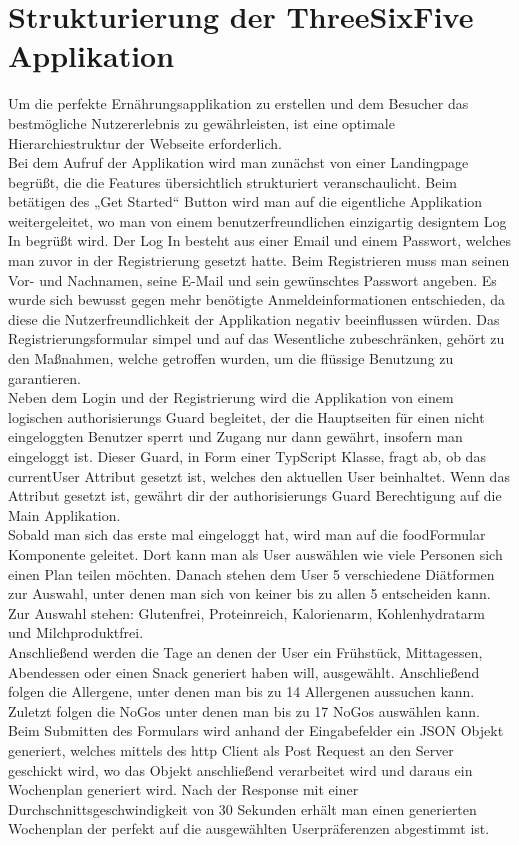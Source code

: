 \section{Strukturierung der ThreeSixFive Applikation}
Um die perfekte Ernährungsapplikation zu erstellen und dem Besucher das bestmögliche Nutzererlebnis zu gewährleisten, ist eine optimale Hierarchiestruktur der Webseite erforderlich.\\
Bei dem Aufruf der Applikation wird man zunächst von einer Landingpage begrüßt, die die Features übersichtlich strukturiert veranschaulicht. Beim betätigen des „Get Started“ Button wird man auf die eigentliche Applikation weitergeleitet, wo man von einem benutzerfreundlichen einzigartig designtem Log In begrüßt wird. Der Log In besteht aus einer Email und einem Passwort, welches man zuvor in der Registrierung gesetzt hatte. Beim Registrieren muss man seinen Vor- und Nachnamen, seine E-Mail und sein gewünschtes Passwort angeben. Es wurde sich bewusst gegen mehr benötigte Anmeldeinformationen entschieden, da diese die Nutzerfreundlichkeit der Applikation negativ beeinflussen würden. Das Registrierungsformular simpel und auf das Wesentliche zubeschränken, gehört zu den Maßnahmen, welche getroffen wurden, um die flüssige Benutzung zu garantieren.\\



Neben dem Login und der Registrierung wird die Applikation von einem logischen authorisierungs Guard begleitet, der die Hauptseiten für einen nicht eingeloggten Benutzer sperrt und Zugang nur dann gewährt, insofern man eingeloggt ist. Dieser Guard, in Form einer TypScript Klasse, fragt ab, ob das currentUser Attribut gesetzt ist, welches den aktuellen User beinhaltet. Wenn das Attribut gesetzt ist, gewährt dir der authorisierungs Guard Berechtigung auf die Main Applikation.\\



Sobald man sich das erste mal eingeloggt hat, wird man auf die foodFormular Komponente geleitet. Dort kann man als User auswählen wie viele Personen sich einen Plan teilen möchten. Danach stehen dem User 5 verschiedene Diätformen zur Auswahl, unter denen man sich von keiner bis zu allen 5 entscheiden kann. Zur Auswahl stehen: Glutenfrei, Proteinreich, Kalorienarm, Kohlenhydratarm und Milchproduktfrei.\\


Anschließend werden die Tage an denen der User ein Frühstück, Mittagessen, Abendessen oder einen Snack generiert haben will, ausgewählt. Anschließend folgen die Allergene, unter denen man bis zu 14 Allergenen aussuchen kann. Zuletzt folgen die NoGos unter denen man bis zu 17 NoGos auswählen kann. Beim Submitten des Formulars wird anhand der Eingabefelder ein JSON Objekt generiert, welches mittels des http Client als Post Request an den Server geschickt wird, wo das Objekt anschließend verarbeitet wird und daraus ein Wochenplan generiert wird. Nach der Response mit einer Durchschnittsgeschwindigkeit von 30 Sekunden erhält man einen generierten Wochenplan der perfekt auf die ausgewählten Userpräferenzen abgestimmt ist.\\


